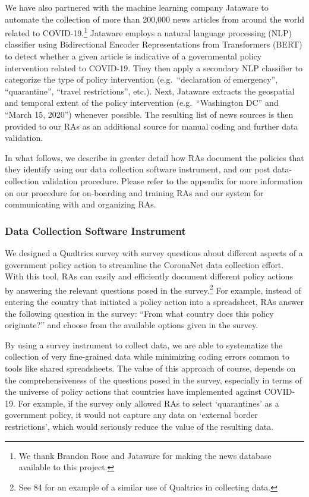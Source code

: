 \documentclass[
]{article}
\begin{document}
We have also partnered with the machine learning company Jataware to automate the collection of more than 200,000 news articles from around the world related to COVID-19.\footnote{We thank Brandon Rose and Jataware for making the news database available to this project.} Jataware employs a natural language processing (NLP) classifier using Bidirectional Encoder Representations from Transformers (BERT) to detect whether a given article is indicative of a governmental policy intervention related to COVID-19. They then apply a secondary NLP classifier to categorize the type of policy intervention (e.g.~``declaration of emergency'', ``quarantine'', ``travel restrictions'', etc.). Next, Jataware extracts the geospatial and temporal extent of the policy intervention (e.g.~``Washington DC'' and ``March 15, 2020'') whenever possible. The resulting list of news sources is then provided to our RAs as an additional source for manual coding and further data validation.

In what follows, we describe in greater detail how RAs document the policies that they identify using our data collection software instrument, and our post data-collection validation procedure. Please refer to the appendix for more information on our procedure for on-boarding and training RAs and our system for communicating with and organizing RAs.

\hypertarget{data-collection-software-instrument}{%
\subsubsection*{Data Collection Software Instrument}\label{data-collection-software-instrument}}

We designed a Qualtrics survey with survey questions about different aspects of a government policy action to streamline the CoronaNet data collection effort. With this tool, RAs can easily and efficiently document different policy actions by answering the relevant questions posed in the survey.\footnote{See 84 for an example of a similar use of Qualtrics in collecting data.} For example, instead of entering the country that initiated a policy action into a spreadsheet, RAs answer the following question in the survey: ``From what country does this policy originate?'' and choose from the available options given in the survey.

By using a survey instrument to collect data, we are able to systematize the collection of very fine-grained data while minimizing coding errors common to tools like shared spreadsheets. The value of this approach of course, depends on the comprehensiveness of the questions posed in the survey, especially in terms of the universe of policy actions that countries have implemented against COVID-19. For example, if the survey only allowed RAs to select `quarantines' as a government policy, it would not capture any data on `external border restrictions', which would seriously reduce the value of the resulting data.
\end{document}
